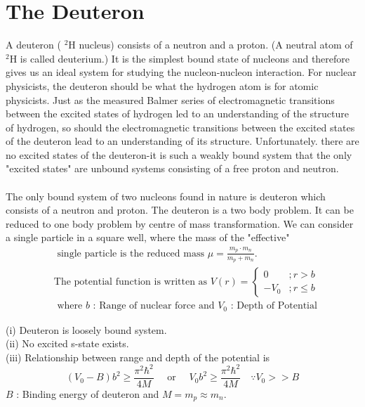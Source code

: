 \section{The Deuteron}
A deuteron ( ${ }^{2} \mathrm{H}$ nucleus) consists of a neutron and a proton. (A neutral atom of ${ }^{2} \mathrm{H}$ is called deuterium.) It is the simplest bound state of nucleons and therefore gives us an ideal system for studying the nucleon-nucleon interaction. For nuclear physicists, the deuteron should be what the hydrogen atom is for atomic physicists. Just as the measured Balmer series of electromagnetic transitions between the excited states of hydrogen led to an understanding of the structure of hydrogen, so should the electromagnetic transitions between the excited states of the deuteron lead to an understanding of its structure. Unfortunately. there are no excited states of the deuteron-it is such a weakly bound system that the only "excited states" are unbound systems consisting of a free proton and neutron.\\\\
The only bound system of two nucleons found in nature is deuteron which consists of a neutron and proton. The deuteron is a two body problem. It can be reduced to one body problem by centre of mass transformation. We can consider a single particle in a square well, where the mass of the "effective"
\begin{align*}
&\text{ single particle is the reduced mass $\mu=\frac{m_p \cdot m_n}{m_p+m_n}$.}\\
&\text{The potential function is written as $V(r)=\left\{\begin{aligned} 0 & ; r>b \\-V_0 & ; r \leq b \end{aligned}\right.$}\\
&\text{ where $b$ : Range of nuclear force and $V_0$ : Depth of Potential}
\end{align*}
\begin{note}
	 (i) Deuteron is loosely bound system.\\
	(ii) No excited s-state exists.\\
	(iii) Relationship between range and depth of the potential is
	$$
	\left(V_0-B\right) b^2 \geq \frac{\pi^2 \hbar^2}{4 M} \quad \text { or } \quad V_0 b^2 \geq \frac{\pi^2 \hbar^2}{4 M} \quad \because V_0>>B
	$$
	$B$ : Binding energy of deuteron and $M=m_p \approx m_n$.
\end{note}













